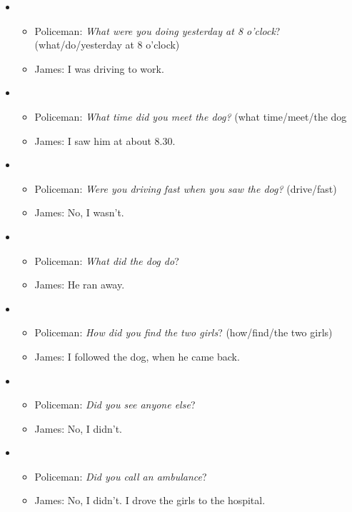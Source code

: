 \begin{itemize}

\item
\begin{itemize}
\item Policeman: \textit{What were you doing yesterday at 8 o'clock}? (what/do/yesterday at 8 o'clock)
\item James: I was driving to work.
\end{itemize}

\item
\begin{itemize}
\item Policeman: \textit{What time did you meet the dog?} (what time/meet/the dog
\item James: I saw him at about 8.30.
\end{itemize}

\item
\begin{itemize}
\item Policeman: \textit{Were you driving fast when you saw the dog?} (drive/fast)
\item James: No, I wasn't.
\end{itemize}

\item
\begin{itemize}
\item Policeman: \textit{What did the dog do}? 
\item James: He ran away.
\end{itemize}

\item
\begin{itemize}
\item Policeman: \textit{How did you find the two girls}? (how/find/the two girls)
\item James: I followed the dog, when he came back.
\end{itemize}

\item
\begin{itemize}
\item Policeman: \textit{Did you see anyone else}?
\item James: No, I didn't.
\end{itemize}

\item
\begin{itemize}
\item Policeman: \textit{Did you call an ambulance}?
\item James: No, I didn't. I drove the girls to the
hospital.
\end{itemize}

\end{itemize}


